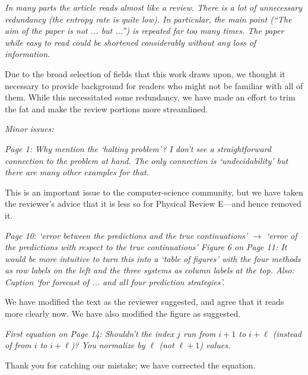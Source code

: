 \documentclass[12pt]{article}
\newcommand{\alert}[1]{{\color{red}#1}}
\begin{document}
\emph{In many parts the article reads almost like a review. There is a
  lot of unnecessary redundancy (the entropy rate is quite low). In
  particular, the main point (``The aim of the paper is not ... but
  ...'') is repeated far too many times. The paper while easy to read
  could be shortened considerably without any loss of information.}

Due to the broad selection of fields that this work draws upon, we
thought it necessary to provide background for readers who might not
be familiar with all of them.  While this necessitated some
redundancy, we have made an effort to trim the fat and make the review
portions more streamlined.

\noindent\emph{Minor issues:}

\emph{Page 1: Why mention the `halting problem'? I don't see a
  straightforward connection to the problem at hand. The only
  connection is `undecidability' but there are many other examples for
  that.}

This is an important issue to the computer-science community, but we
have taken the reviewer's advice that it is less so for Physical
Review E---and hence removed it.


\emph{Page 10: `error between the predictions and the true continuations'
$\rightarrow$ `error of the predictions with respect to the true continuations'
Figure 6 on Page 11: It would be more intuitive to turn this into a `table of
figures' with the four methods as row labels on the left and the three systems
as column labels at the top. Also: Caption `for forecast of ... and all four
prediction strategies'.}

We have modified the text as the reviewer suggested, and agree that it reads
more clearly now. We have also modified the figure as suggested.

\emph{First equation on Page 14: Shouldn't the index $j$ run from $i+1$ to
$i+\ell$ (instead of from $i$ to $i+\ell$)? You normalize by $\ell$ (not
$\ell+1$) values.}

Thank you for catching our mistake; we have corrected the equation.
\end{document}
